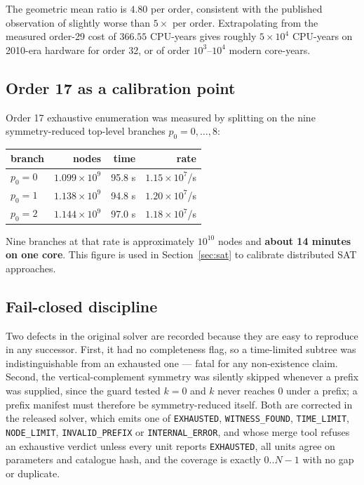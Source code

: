 \documentclass[11pt,a4paper]{article}
\theoremstyle{definition}
\begin{document}
The geometric mean ratio is $\mathbf{4.80}$ per order, consistent with the
published observation of slightly worse than $5\times$ per order. Extrapolating
from the measured order-29 cost of $366.55$ CPU-years gives roughly
$5\times10^4$ CPU-years on 2010-era hardware for order 32, or of order
$10^3$--$10^4$ modern core-years.

\subsection{Order 17 as a calibration point}

Order 17 exhaustive enumeration was measured by splitting on the nine
symmetry-reduced top-level branches $p_0 = 0,\dots,8$:

\begin{center}
\begin{tabular}{@{}lrrr@{}}
\toprule
branch & nodes & time & rate \\
\midrule
$p_0=0$ & $1.099\times10^9$ & 95.8 s & $1.15\times10^7$/s \\
$p_0=1$ & $1.138\times10^9$ & 94.8 s & $1.20\times10^7$/s \\
$p_0=2$ & $1.144\times10^9$ & 97.0 s & $1.18\times10^7$/s \\
\bottomrule
\end{tabular}
\end{center}

Nine branches at that rate is approximately $10^{10}$ nodes and
\textbf{about 14 minutes on one core}. This figure is used in
Section~\ref{sec:sat} to calibrate distributed SAT approaches.

\subsection{Fail-closed discipline}\label{sec:discipline}

Two defects in the original solver are recorded because they are easy to
reproduce in any successor. First, it had no completeness flag, so a
time-limited subtree was indistinguishable from an exhausted one --- fatal for
any non-existence claim. Second, the vertical-complement symmetry was silently
skipped whenever a prefix was supplied, since the guard tested $k=0$ and $k$
never reaches 0 under a prefix; a prefix manifest must therefore be
symmetry-reduced itself. Both are corrected in the released solver, which emits
one of \texttt{EXHAUSTED}, \texttt{WITNESS\_FOUND}, \texttt{TIME\_LIMIT},
\texttt{NODE\_LIMIT}, \texttt{INVALID\_PREFIX} or \texttt{INTERNAL\_ERROR}, and
whose merge tool refuses an exhaustive verdict unless every unit reports
\texttt{EXHAUSTED}, all units agree on parameters and catalogue hash, and the
coverage is exactly $0..N{-}1$ with no gap or duplicate.
\end{document}
